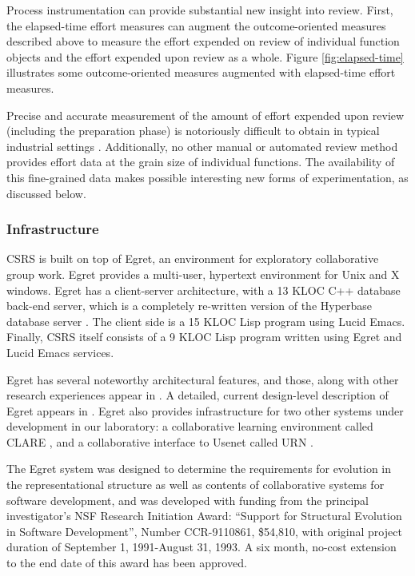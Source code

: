 Process instrumentation can provide substantial new insight into review.
First, the elapsed-time effort measures can augment the outcome-oriented
measures described above to measure the effort expended on review of
individual function objects and the effort expended upon review as a whole.
Figure \ref{fig:elapsed-time} illustrates some outcome-oriented measures
augmented with elapsed-time effort measures.

Precise and accurate measurement of the amount of effort expended upon
review (including the preparation phase) is notoriously difficult to obtain
in typical industrial settings \cite{Freedman90}.  Additionally, no other
manual or automated review method provides effort data at the grain size of
individual functions.  The availability of this fine-grained data makes
possible interesting new forms of experimentation, as discussed below.

\subsubsection{Infrastructure}
\label{sec:infrastructure}

CSRS is built on top of Egret, an environment for exploratory collaborative
group work. Egret provides a multi-user, hypertext environment for Unix and
X windows.  Egret has a client-server architecture, with a 13 KLOC C++
database back-end server, which is a completely re-written version of the
Hyperbase database server \cite{Wiil90}. The client side is a 15 KLOC Lisp
program using Lucid Emacs.  Finally, CSRS itself consists of a 9  KLOC
Lisp program written using Egret and Lucid Emacs services.

Egret has several noteworthy architectural features, and those, along with
other research experiences appear in
\cite{csdl-91-03,csdl-92-01,csdl-92-08,csdl-93-09}.  A detailed, current
design-level description of Egret appears in \cite{csdl-91-02}.  Egret also
provides infrastructure for two other systems under development in our
laboratory: a collaborative learning environment called CLARE
\cite{csdl-93-14}, and a collaborative interface to Usenet called URN
\cite{csdl-93-06}.

The Egret system was designed to determine the requirements for evolution
in the representational structure as well as contents of collaborative
systems for software development, and was developed with funding from the
principal investigator's NSF Research Initiation Award: ``Support for
Structural Evolution in Software Development'', Number CCR-9110861,
\$54,810, with original project duration of September 1, 1991-August 31,
1993.  A six month, no-cost extension to the end date of this award has
been approved.

